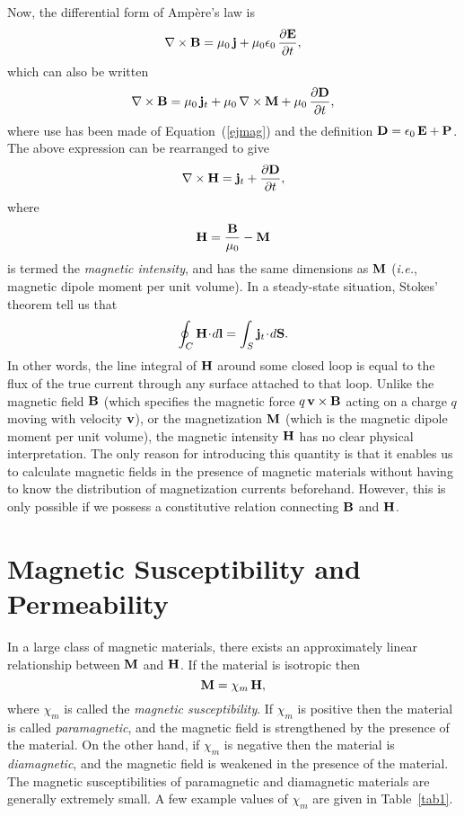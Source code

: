 Now, the differential form of Amp\`{e}re's law is
\begin{equation}
\nabla\times{\bf B} = \mu_0\,{\bf j} + \mu_0\epsilon_0\,\frac{\partial {\bf E}}
{\partial t},
\end{equation}
which can also be written
\begin{equation}
\nabla\times{\bf B} = \mu_0\,{\bf j}_t +\mu_0\,\nabla\times{\bf M}
+ \mu_0\,\frac{\partial{\bf D}}{\partial t},
\end{equation}
where use has been made of Equation~(\ref{ejmag}) and the definition ${\bf D} = \epsilon_0\,{\bf E} +
{\bf P}$. The above expression can be rearranged to give
\begin{equation}\label{e5.121x}
\nabla\times{\bf H} = {\bf j}_t + \frac{\partial{\bf D}}{\partial t},
\end{equation}
where
\begin{equation}
{\bf H} = \frac{\bf B}{\mu_0} - {\bf M}
\end{equation}
is termed the {\em magnetic intensity}, and has the same dimensions
as ${\bf M}$ ({\em i.e.}, magnetic dipole moment per unit volume). 
In a steady-state situation, Stokes' theorem tell us that
\begin{equation}
\oint_C {\bf H}\!\cdot\!d{\bf l} = \int_S {\bf j}_t\!\cdot\!d{\bf S}.
\end{equation}
In other words, the line integral of ${\bf H}$ around some closed loop
is equal to the flux of the true  current through any surface attached to that
loop. Unlike the magnetic field ${\bf B}$ (which specifies
the magnetic force $q \,{\bf v}\times {\bf B}$ acting on a charge $q$ moving
with velocity ${\bf v}$),
or the magnetization ${\bf M}$ (which is the magnetic dipole moment
per unit volume), the magnetic intensity ${\bf H}$ has no clear physical
interpretation. The only reason for introducing this quantity is that it enables us to
calculate magnetic fields in the presence of magnetic materials without
having to know the distribution of magnetization currents beforehand. 
However, this is only possible if we possess a constitutive relation
connecting ${\bf B}$ and ${\bf H}$. 

\section{Magnetic Susceptibility and Permeability}
In a large class of magnetic materials, there exists an approximately linear
relationship between ${\bf M}$ and ${\bf H}$. If the material
is isotropic then
\begin{equation}\label{e6.124}
{\bf M} = \chi_m\, {\bf H},
\end{equation}
where $\chi_m$ is called the {\em magnetic susceptibility}. If $\chi_m$ is
positive then the material is called {\em paramagnetic}, and the magnetic field
is strengthened by the presence of the material. On the other hand, if $\chi_m$ is
negative then the material is {\em diamagnetic}, and the magnetic field
is weakened in the presence of the material. The magnetic
susceptibilities of paramagnetic and diamagnetic materials are
generally extremely small. A few example values of $\chi_m$ are given in Table~\ref{tab1}.

